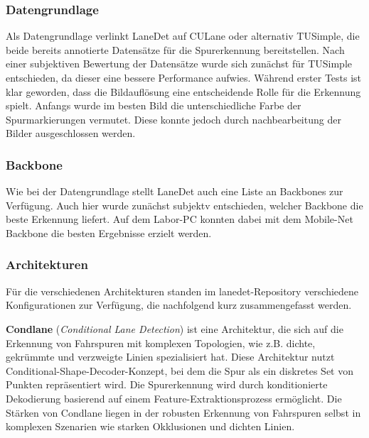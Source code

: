 \documentclass{article}
\begin{document}
            \subsubsection{Datengrundlage}
            Als Datengrundlage verlinkt LaneDet auf CULane oder alternativ TUSimple, die beide bereits annotierte Datensätze für die Spurerkennung bereitstellen. 
                Nach einer subjektiven Bewertung der Datensätze wurde sich zunächst für TUSimple entschieden, da dieser eine bessere Performance aufwies.
            Während erster Tests ist klar geworden, dass die Bildauflösung eine entscheidende Rolle für die Erkennung spielt. Anfangs wurde im besten Bild die unterschiedliche Farbe der Spurmarkierungen vermutet. Diese konnte jedoch durch nachbearbeitung der Bilder ausgeschlossen werden.

            \subsubsection{Backbone}
            Wie bei der Datengrundlage stellt LaneDet auch eine Liste an Backbones zur Verfügung. Auch hier wurde zunächst subjektv entschieden, welcher Backbone die beste Erkennung liefert.
            Auf dem Labor-PC konnten dabei mit dem Mobile-Net Backbone die besten Ergebnisse erzielt werden.
            \subsubsection{Architekturen}
                Für die verschiedenen Architekturen standen im lanedet-Repository verschiedene Konfigurationen zur Verfügung, die nachfolgend kurz zusammengefasst werden.

                \textbf{Condlane} (\textit{Conditional Lane Detection}) ist eine Architektur, die sich auf die Erkennung von Fahrspuren mit komplexen Topologien, wie z.B. dichte, gekrümmte und verzweigte Linien spezialisiert hat. Diese Architektur nutzt Conditional-Shape-Decoder-Konzept, bei dem die Spur als ein diskretes Set von Punkten repräsentiert wird. Die Spurerkennung wird durch konditionierte Dekodierung basierend auf einem Feature-Extraktionsprozess ermöglicht. Die Stärken von Condlane liegen in der robusten Erkennung von Fahrspuren selbst in komplexen Szenarien wie starken Okklusionen und dichten Linien.
                \cite{Ganeriwala2023Cross}
\end{document}
